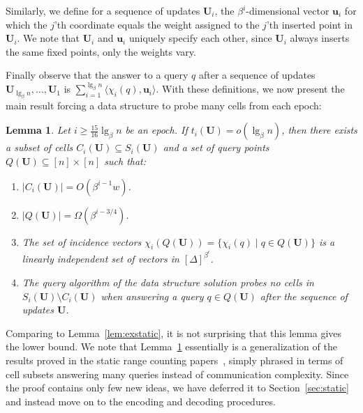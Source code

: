 \documentclass[letterpaper]{article}
\newtheorem{lemma}{Lemma}
\newcommand{\uv}{\textbf{u}}
\newcommand{\U}{\textbf{U}}
\newcommand{\inc}[1]{\chi_{#1}}
\begin{document}
Similarly, we define for a sequence of updates $\U_i$, the
$\beta^i$-dimensional vector $\uv_i$ for which the $j$'th coordinate
equals the weight assigned to the $j$'th inserted point in $\U_i$. We
note that $\U_i$ and $\uv_i$ uniquely specify each other, since
$\U_i$ always inserts the same fixed points, only the weights vary.

Finally observe that the answer to a query $q$ after a sequence of
updates $\U_{\lg_\beta n},\dots, \U_1$ is $\sum_{i=1}^{\lg_\beta n}
\langle \inc{i}(q), \uv_i\rangle$.  With these definitions, we now
present the main result forcing a data structure to probe many cells
from each epoch:
\begin{lemma}
\label{lem:static}
Let $i \geq \tfrac{15}{16}\lg_\beta n$ be an epoch. If
$t_i(\U)=o(\lg_\beta n)$, then there exists a subset of cells $C_i(\U)
\subseteq S_i(\U)$ and a set of query points $Q(\U) \subseteq [n] \times
          [n]$ such that:
\begin{enumerate}
\item $|C_i(\U)| = O(\beta^{i-1}w)$.
\item $|Q(\U)| = \Omega(\beta^{i-3/4})$.
\item The set of incidence vectors $\inc{i}(Q(\U)) = \{ \inc{i}(q)
  \mid q \in Q(\U)\}$ is a linearly independent set of vectors in
  $[\Delta]^{\beta^i}$.
\item The query algorithm of the data structure solution probes no
  cells in $S_i(\U) \setminus C_i(\U)$ when answering a query $q \in
  Q(\U)$ after the sequence of updates $\U$.
\end{enumerate}
\end{lemma}

Comparing to Lemma~\ref{lem:exstatic}, it is not surprising that this
lemma gives the lower bound. We note that Lemma~\ref{lem:static}
essentially is a generalization of the results proved in the static
range counting papers~\cite{patrascu07sum2D,larsen:median}, simply
phrased in terms of cell subsets answering many queries instead of
communication complexity. Since the proof contains only few new ideas,
we have deferred it to Section~\ref{sec:static} and instead move on to
the encoding and decoding procedures.
\end{document}
